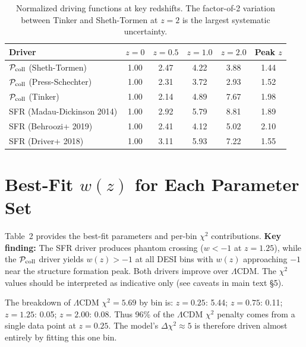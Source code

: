 \documentclass[aps,prd,onecolumn]{revtex4-2}
\begin{document}
\begin{table}[h]
\centering
\caption{Normalized driving functions at key redshifts. The factor-of-2 variation between Tinker and Sheth-Tormen at $z=2$ is the largest systematic uncertainty.}
\begin{tabular}{lccccc}
\toprule
Driver & $z=0$ & $z=0.5$ & $z=1.0$ & $z=2.0$ & Peak $z$ \\
\midrule
$\mathcal{P}_{\rm coll}$ (Sheth-Tormen) & 1.00 & 2.47 & 4.22 & 3.88 & 1.44 \\
$\mathcal{P}_{\rm coll}$ (Press-Schechter) & 1.00 & 2.31 & 3.72 & 2.93 & 1.52 \\
$\mathcal{P}_{\rm coll}$ (Tinker) & 1.00 & 2.14 & 4.89 & 7.67 & 1.98 \\
SFR (Madau-Dickinson 2014) & 1.00 & 2.92 & 5.79 & 8.81 & 1.89 \\
SFR (Behroozi+ 2019) & 1.00 & 2.41 & 4.12 & 5.02 & 2.10 \\
SFR (Driver+ 2018) & 1.00 & 3.11 & 5.93 & 7.22 & 1.55 \\
\bottomrule
\end{tabular}
\label{sm:tab_drivers}
\end{table}

\section{Best-Fit $w(z)$ for Each Parameter Set}

Table~2 provides the best-fit parameters and per-bin $\chi^2$ contributions. \textbf{Key finding:} The SFR driver produces phantom crossing ($w < -1$ at $z=1.25$), while the $\mathcal{P}_{\rm coll}$ driver yields $w(z) > -1$ at all DESI bins with $w(z)$ approaching $-1$ near the structure formation peak. Both drivers improve over $\Lambda$CDM. The $\chi^2$ values should be interpreted as indicative only (see caveats in main text \S5).

The breakdown of $\Lambda$CDM $\chi^2 = 5.69$ by bin is: $z=0.25$: 5.44; $z=0.75$: 0.11; $z=1.25$: 0.05; $z=2.00$: 0.08. Thus 96\% of the $\Lambda$CDM $\chi^2$ penalty comes from a single data point at $z=0.25$. The model's $\Delta\chi^2 \approx 5$ is therefore driven almost entirely by fitting this one bin.
\end{document}
